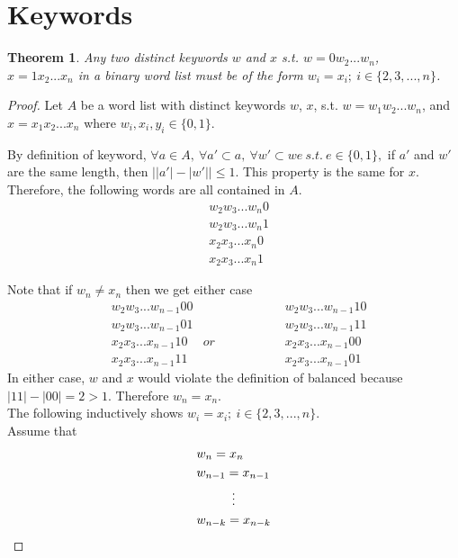 \documentclass{article}
\newtheorem{theorem}{Theorem}[section]
\begin{document}
    
\section{Keywords}

\begin{theorem}\label{mostlyEqual}
    Any two distinct keywords $w$ and $x$ s.t. $w = 0w_2...w_{n}$, \\ $x = 1x_2...x_{n}$ in a binary word list must be of the form $w_i = x_i;\ i \in \{2,3,...,n\}$.
\end{theorem}
\begin{proof}
Let $A$ be a word list with distinct keywords $w$, $x$, s.t. $w = w_1w_2...w_{n}$, and $x = x_1x_2...x_{n}$ where $w_i,x_i,y_i \in \{0, 1\}$. 

By definition of keyword, $\forall a \in A,\ \forall a' \subset a,\ \forall w' \subset we\ s.t.\ e \in \{0,1\},$ if $a'$ and $w'$ are the same length, then $\Big||a'| - |w'| \Big| \le 1$. This property is the same for $x$. Therefore, the following words are all contained in $A$.
\begin{align*}
    &w_2w_3...w_{n}0   \\
    &w_2w_3...w_{n}1   \\ 
    &x_2x_3...x_{n}0   \\ 
    &x_2x_3...x_{n}1   
\end{align*}

Note that if $w_{n} \neq x_{n}$ then we get either case 
\begin{align*}
    &w_2w_3...w_{n-1}00 &               & w_2w_3...w_{n-1}10  \\
    &w_2w_3...w_{n-1}01 &               & w_2w_3...w_{n-1}11  \\
    &x_2x_3...x_{n-1}10 &or \hspace{2cm}& x_2x_3...x_{n-1}00  \\
    &x_2x_3...x_{n-1}11 &               & x_2x_3...x_{n-1}01 
\end{align*}
In either case, $w$ and $x$ would violate the definition of balanced because \\ $|11|-|00| = 2 > 1$. Therefore $w_{n} = x_{n}$. \\

The following inductively shows $w_i = x_i;\ i \in \{2, 3, ..., n\}$. \\
Assume that 
\begin{align*}
    & w_{n} = x_{n} \\
    & w_{n-1} = x_{n-1} \\
    & \vdotswithin{w_{n-k} = x_{n-k}} \\
    &w_{n-k} = x_{n-k}
\end{align*}


\end{proof}
\end{document}
